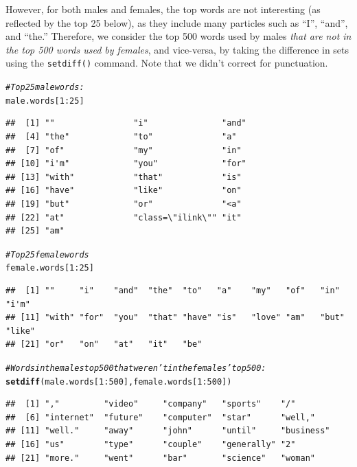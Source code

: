 \documentclass{article}\usepackage[]{graphicx}\usepackage[]{color}
\makeatletter
\newcommand{\hlnum}[1]{\textcolor[rgb]{0.686,0.059,0.569}{#1}}%
\newcommand{\hlcom}[1]{\textcolor[rgb]{0.678,0.584,0.686}{\textit{#1}}}%
\newcommand{\hlopt}[1]{\textcolor[rgb]{0,0,0}{#1}}%
\newcommand{\hlstd}[1]{\textcolor[rgb]{0.345,0.345,0.345}{#1}}%
\newcommand{\hlkwd}[1]{\textcolor[rgb]{0.737,0.353,0.396}{\textbf{#1}}}%
\newenvironment{kframe}{%
 \def\at@end@of@kframe{}%
 \ifinner\ifhmode%
  \def\at@end@of@kframe{\end{minipage}}%
  \begin{minipage}{\columnwidth}%
 \fi\fi%
 \def\FrameCommand##1{\hskip\@totalleftmargin \hskip-\fboxsep
 \colorbox{shadecolor}{##1}\hskip-\fboxsep
     \hskip-\linewidth \hskip-\@totalleftmargin \hskip\columnwidth}%
 \MakeFramed {\advance\hsize-\width
   \@totalleftmargin\z@ \linewidth\hsize
   \@setminipage}}%
 {\par\unskip\endMakeFramed%
 \at@end@of@kframe}
\newenvironment{knitrout}{}{} %
\makeatother
\begin{document}
However, for both males and females, the top words are not interesting (as reflected by the top 25 below), as they include many particles such as ``I'', ``and'', and ``the.''  Therefore, we consider the top 500 words used by males \textit{that are not in the top 500 words used by females}, and vice-versa, by taking the difference in sets using the \verb#setdiff()# command.  Note that we didn't correct for punctuation.
\begin{knitrout}
\color{fgcolor}\begin{kframe}
\begin{alltt}
\hlcom{# Top 25 male words:}
\hlstd{male.words[}\hlnum{1}\hlopt{:}\hlnum{25}\hlstd{]}
\end{alltt}
\begin{verbatim}
##  [1] ""                "i"               "and"            
##  [4] "the"             "to"              "a"              
##  [7] "of"              "my"              "in"             
## [10] "i'm"             "you"             "for"            
## [13] "with"            "that"            "is"             
## [16] "have"            "like"            "on"             
## [19] "but"             "or"              "<a"             
## [22] "at"              "class=\"ilink\"" "it"             
## [25] "am"
\end{verbatim}
\begin{alltt}
\hlcom{# Top 25 female words}
\hlstd{female.words[}\hlnum{1}\hlopt{:}\hlnum{25}\hlstd{]}
\end{alltt}
\begin{verbatim}
##  [1] ""     "i"    "and"  "the"  "to"   "a"    "my"   "of"   "in"   "i'm" 
## [11] "with" "for"  "you"  "that" "have" "is"   "love" "am"   "but"  "like"
## [21] "or"   "on"   "at"   "it"   "be"
\end{verbatim}
\begin{alltt}
\hlcom{# Words in the males top 500 that weren't in the females' top 500:}
\hlkwd{setdiff}\hlstd{(male.words[}\hlnum{1}\hlopt{:}\hlnum{500}\hlstd{], female.words[}\hlnum{1}\hlopt{:}\hlnum{500}\hlstd{])}
\end{alltt}
\begin{verbatim}
##  [1] ","         "video"     "company"   "sports"    "/"        
##  [6] "internet"  "future"    "computer"  "star"      "well,"    
## [11] "well."     "away"      "john"      "until"     "business" 
## [16] "us"        "type"      "couple"    "generally" "2"        
## [21] "more."     "went"      "bar"       "science"   "woman"    

\end{verbatim}
\end{kframe}
\end{knitrout}
\end{document}
